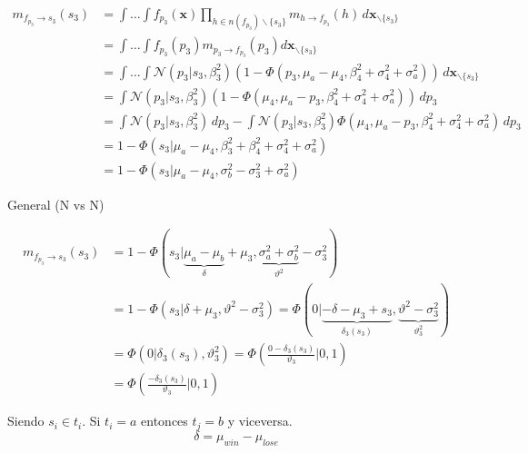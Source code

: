 \documentclass[11pt,twoside,spanish]{report} %
\begin{document}
\begin{equation}
	\begin{split}
		m_{f_{p_3} \rightarrow s_3}(s_3) & = \int \dots \int f_{p_3}(\textbf{x}) \prod_{h \in n(f_{p_3}) \backslash \{s_3\} } m_{h \rightarrow f_{p_3}}(h) \, d\textbf{x}_{\backslash \{s_3\} }  \\
		&= \int \dots \int f_{p_3}(p_3)m_{p_3 \rightarrow f_{p_3}}(p_3) d\textbf{x}_{\backslash \{s_3\} }  \\
		&= \int \dots \int \mathcal{N}(p_3| s_3, \beta_3^2) (1 - \Phi(p_3, \mu_a  - \mu_4, \beta_4^2 + \sigma_4^2 + \sigma_a^2)) \, d\textbf{x}_{\backslash \{s_3\} }\\
		& = \int \mathcal{N}(p_3| s_3, \beta_3^2) (1 - \Phi(\mu_4, \mu_a  - p_3, \beta_4^2 + \sigma_4^2 + \sigma_a^2)) \, dp_3 \\
		&=\int \mathcal{N}(p_3| s_3, \beta_3^2) \, dp_3 -  \int \mathcal{N}(p_3| s_3, \beta_3^2)  \Phi(\mu_4, \mu_a  - p_3, \beta_4^2 + \sigma_4^2 + \sigma_a^2) \, dp_3 \\
		&=1 - \Phi\left(s_3| \mu_a-  \mu_4, \beta_3^2 +\beta_4^2 + \sigma_4^2 + \sigma_a^2 \right)\\
		&=1 - \Phi\left(s_3| \mu_a-  \mu_4, \sigma_b^2-\sigma_3^2 + \sigma_a^2 \right)
	\end{split}
\end{equation}

General (N vs N)

\begin{equation}
	\begin{split}
		m_{f_{p_3} \rightarrow s_3}(s_3) & = 1 - \Phi(s_3| \underbrace{\mu_a-\mu_b}_{\delta}+\mu_3, \underbrace{\sigma_a^2 + \sigma_b^2}_{\vartheta^2} - \sigma_3^2 ) \\
		& = 1 - \Phi(s_3| \delta+\mu_3, \vartheta^2- \sigma_3^2 ) = \Phi(0| \underbrace{-\delta-\mu_3+s_3}_{\delta_3(s_3)}, \underbrace{\vartheta^2- \sigma_3^2}_{\vartheta_3^2}) \\
		& = \Phi(0|\delta_3(s_3),\vartheta_3^2)  = \Phi\left(\frac{0-\delta_3(s_3)}{\vartheta_3}|0,1\right) \\
		& = \Phi\left(\frac{-\delta_3(s_3)}{\vartheta_3}|0,1\right)
	\end{split}
\end{equation}

Siendo $s_i \in t_i$. Si $t_i = a$ entonces $t_j=b$ y viceversa.
\begin{equation}
	\delta = \mu_{win} - \mu_{lose}
\end{equation}
\end{document}
